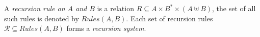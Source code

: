 \documentclass[a4paper,final,preprint,sort&compress]{elsarticle}
\newcommand{\Rules}{\ensuremath{\mathit{Rules}}}
\begin{document}


\newcommand{\R}{\ensuremath{\mathcal{R}}}

A \emph{recursion rule on $A$ and $B$} is a relation $R \subseteq A \times B^* \times (A \uplus B)$, the set
of all such rules is denoted by $\Rules(A,B)$. Each set of recursion rules \mbox{$\R \subseteq \Rules(A,B)$} forms a
\emph{recursion system}.
\end{document}

